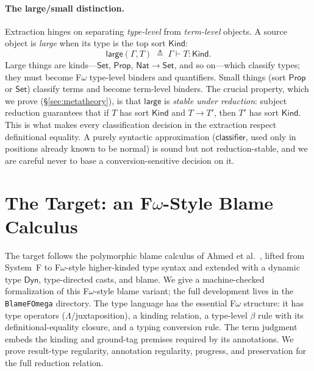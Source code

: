 \documentclass[acmsmall,anonymous=false,nonacm]{acmart}
\newcommand{\dyn}{\ensuremath{\mathsf{Dyn}}}
\newcommand{\Prop}{\ensuremath{\mathsf{Prop}}}
\newcommand{\Set}{\ensuremath{\mathsf{Set}}}
\newcommand{\Kind}{\ensuremath{\mathsf{Kind}}}
\newcommand{\Nat}{\ensuremath{\mathsf{Nat}}}
\newcommand{\islarge}{\mathsf{large}}
\newcommand{\reduces}{\longrightarrow}
\newcommand{\hastype}[3]{#1 \vdash #2 : #3}
\begin{document}
\paragraph{The large/small distinction.}
Extraction hinges on separating \emph{type-level} from \emph{term-level}
objects. A source object is \emph{large} when its type is the top sort $\Kind$:
\[
\islarge(\Gamma, T) \;\triangleq\; \hastype{\Gamma}{T}{\Kind}.
\]
Large things are kinds---$\Set$, $\Prop$, $\Nat \to \Set$, and so on---which
classify types; they must become F$\omega$ type-level binders and quantifiers.
Small things (sort $\Prop$ or $\Set$) classify terms and become term-level
binders. The crucial property, which we prove (\S\ref{sec:metatheory}), is that
$\islarge$ is \emph{stable under reduction}: subject reduction guarantees that
if $T$ has sort $\Kind$ and $T \reduces T'$, then $T'$ has sort $\Kind$. This is
what makes every classification decision in the extraction respect definitional
equality. A purely syntactic approximation ($\mathsf{classifier}$, used only in
positions already known to be normal) is sound but not reduction-stable, and we
are careful never to base a conversion-sensitive decision on it.

\section{The Target: an F$\omega$-Style Blame Calculus}\label{sec:target}

The target follows the polymorphic blame calculus of Ahmed et
al.~\cite{ahmed2011blame}, lifted from System~F to F$\omega$-style
higher-kinded type syntax and extended with a dynamic type $\dyn$,
type-directed casts, and blame. We give a machine-checked
formalization of this F$\omega$-style blame variant; the full development lives in the
\texttt{BlameFOmega} directory. The type language has the essential F$\omega$ structure: it has
type operators ($\Lambda$/juxtaposition), a kinding relation, a type-level
$\beta$ rule with its definitional-equality closure, and a typing conversion
rule. The term judgment embeds the kinding and ground-tag premises required by
its annotations. We prove result-type regularity, annotation regularity,
progress, and preservation for the full reduction relation.
\end{document}
